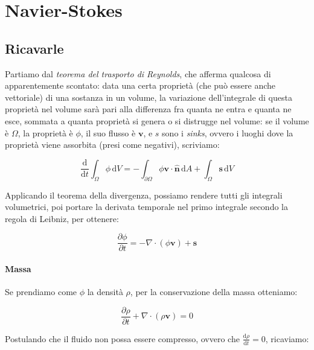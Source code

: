 \documentclass[12pt,a4paper]{article}
\numberwithin{equation}{section}
\begin{document}
\section{Navier-Stokes}

\subsection{Ricavarle}

Partiamo \cite{derivationns} dal \emph{teorema del trasporto di Reynolds}, che afferma qualcosa di apparentemente scontato: data una certa proprietà (che può essere anche vettoriale) di una sostanza in un volume, la variazione dell'integrale di questa proprietà nel volume sarà pari alla differenza fra quanta ne entra e quanta ne esce, sommata a quanta proprietà si genera o si distrugge nel volume: se il volume è $\Omega$, la proprietà è $\phi$, il suo flusso è $\mathbf{v}$, e $s$ sono i \emph{sinks}, ovvero i luoghi dove la proprietà viene assorbita (presi come negativi), scriviamo:

\begin{equation}
\frac{\text{d}}{\text{d} t} \int_{\Omega} \phi \, \text{d} V = -
\int_{\partial \Omega} \phi \mathbf{v} \cdot \mathbf{\hat{n}} \, \text{d} A +
\int_{\Omega} \mathbf{s} \, \text{d} V
\end{equation}

Applicando il teorema della divergenza, possiamo rendere tutti gli integrali volumetrici, poi portare la derivata temporale nel primo integrale secondo la regola di Leibniz, per ottenere:

\begin{equation}
\frac{\partial \phi}{\partial t} = - \nabla \cdot ( \phi \mathbf{v} ) + \mathbf{s}
\end{equation}

\paragraph{Massa}

Se prendiamo come $\phi$ la densità $\rho$, per la conservazione della massa otteniamo:

\begin{equation}
\frac{\partial \rho}{\partial t} + \nabla \cdot ( \rho \mathbf{v} ) = 0 \label{consmassa}
\end{equation}

Postulando che il fluido non possa essere compresso, ovvero che $\frac{\text{d} \rho}{\text{d} t} = 0$, ricaviamo:
\end{document}
